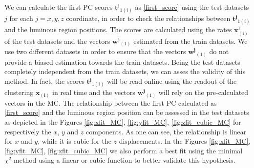 We can calculate the first PC scores $\mathbf{t^j}_{1(i)}$ as \eqref{first_score} using the test datasets $j$ for each $j=x,y,z$ coordinate, in order to check the relationships between $\mathbf{t^{j}}_{1(i)}$ and the luminous region positions. The scores are calculated using the rates $\mathbf{x^{j}_{(i)}}$ of the test datasets and the vectors $\mathbf{w^{j}}_{(1)}$ estimated from the train datasets. We use two different datasets in order to ensure that the vectors $\mathbf{w^{j}}_{(1)}$ do not provide a biased estimation towards the train datasets. Being the test datasets completely independent from the train datasets, we can asses the validity of this method. In fact,  the scores $\mathbf{t^{j}}_{1(i)}$ will be read online using the readout of the clustering $\mathbf{x_{(i)}}$ in real time and the vectors $\mathbf{w^{j}}_{(1)}$ will rely on the pre-calculated vectors in the MC. The relationship between the first PC calculated as \eqref{first_score} and the luminous region position can be assessed in the test datasets as depicted in the Figures \ref{fig:xfit_MC}, \ref{fig:yfit_MC}, \ref{fig:zfit_cubic_MC} for respectively the $x$, $y$ and $z$ components. As one can see, the relationship is linear for $x$ and $y$, while it is cubic for the $z$ displacements. In the Figures \ref{fig:xfit_MC}, \ref{fig:yfit_MC}, \ref{fig:zfit_cubic_MC} we also perform a best fit using the minimal $\chi^2$ method using a linear or cubic function to better validate this hypothesis. 



